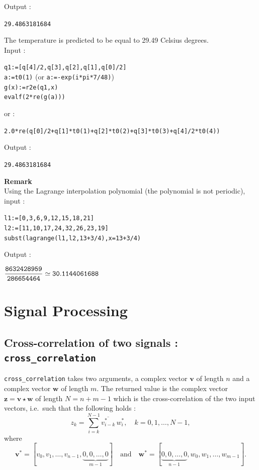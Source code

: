 \documentclass[a4paper,11pt]{book}
\begin{document}
Output :
\begin{center}
{\tt 29.4863181684}
\end{center}
The temperature is predicted to be equal to 29.49 Celsius degrees.\\
Input :
\begin{center}
{\tt q1:=[q[4]/2,q[3],q[2],q[1],q[0]/2]}\\
{\tt a:=t0(1)} (or {\tt a:=-exp(i*pi*7/48)})\\
{\tt g(x):=r2e(q1,x)}\\
{\tt evalf(2*re(g(a)))}
\end{center}
or :
\begin{center}
{\tt 2.0*re(q[0]/2+q[1]*t0(1)+q[2]*t0(2)+q[3]*t0(3)+q[4]/2*t0(4))}
\end{center}
Output :
\begin{center}
{\tt 29.4863181684}
\end{center}

{\bf Remark}\\
Using the Lagrange interpolation polynomial (the polynomial is not periodic),
input :
\begin{center}
{\tt l1:=[0,3,6,9,12,15,18,21]}\\
{\tt l2:=[11,10,17,24,32,26,23,19]}\\
{\tt subst(lagrange(l1,l2,13+3/4),x=13+3/4)}\\
\end{center}
Output :
\begin{center}
${\tt \displaystyle \frac{8632428959}{286654464}\simeq 30.1144061688}$
\end{center}

\section{Signal Processing}
\subsection{Cross-correlation of two signals : {\tt cross\_correlation}}
\label{sec:crosscorr}
{\tt cross\_correlation} takes two arguments, a complex vector $ \mathbf{v} $ of length $ n $ and a complex vector $ \mathbf{w} $ of length $ m $. The returned value is the complex vector $ \mathbf{z}=\mathbf{v}\star\mathbf{w} $ of length $ N=n+m-1 $ which is the cross-correlation of the two input vectors, i.e.~such that the following holds :
\[ z_k=\sum_{i=k}^{N-1}\overline{v_{i-k}^\ast}\,w_i^\ast,\quad k=0,1,\dots,N-1, \]
where
\[ \mathbf{v}^\ast=[v_0,v_1,\dots,v_{n-1},\underbrace{0,0,\dots,0}_{m-1}]\quad\text{and}\quad\mathbf{w}^\ast=[\underbrace{0,0,\dots,0}_{n-1},w_0,w_1,\dots,w_{m-1}]. \]
\end{document}
